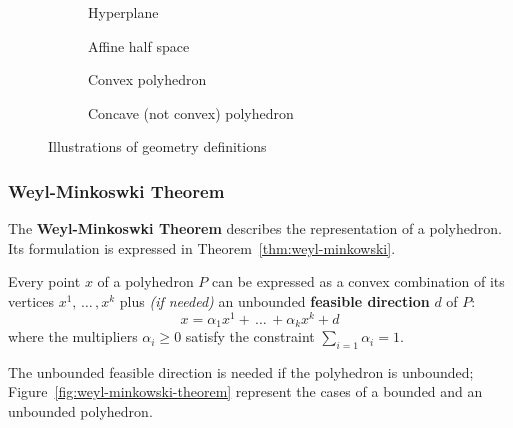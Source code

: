 \documentclass[english]{article}
\begin{document}
\begin{figure}[htbp]
  \bigskip
  \centering
  \begin{subfigure}[b]{0.495\textwidth}
    \centering
    \bigskip
    \caption{Hyperplane}
    \label{subfig:hyperplane}
    \bigskip
  \end{subfigure}
  \bigskip
  \begin{subfigure}[b]{0.495\textwidth}
    \centering
    \bigskip
    \caption{Affine half space}
    \label{subfig:affine-half-space}
    \bigskip
  \end{subfigure}
  \begin{subfigure}[h]{0.495\textwidth}
    \centering
    \bigskip
    \caption{Convex polyhedron}
    \label{subfig:convex-hull}
    \bigskip
  \end{subfigure}
  \begin{subfigure}[h]{0.495\textwidth}
    \centering
    \bigskip
    \caption{Concave (not convex) polyhedron}
    \label{subfig:not-convex-hull}
    \bigskip
  \end{subfigure}
  \caption{Illustrations of \LP geometry definitions}
  \label{fig:lp-geometry}
  \bigskip
\end{figure}

\subsubsection{Weyl-Minkoswki Theorem}

The \textbf{Weyl-Minkoswki Theorem} describes the representation of a polyhedron.
Its formulation is expressed in Theorem~\ref{thm:weyl-minkowski}.

\begin{theorem}
  Every point \(x\) of a polyhedron \(P\) can be expressed as a convex combination of its vertices \(x^1, \, \ldots \,, x^k\) plus \textit{(if needed)} an unbounded \textbf{feasible direction} \(d\) of \(P\):
  \[ x = \alpha_1 x^1 + \, \ldots \, + \alpha_k x^k + d \]
  where the multipliers \(\alpha_i \geq 0\) satisfy the constraint \(\displaystyle\sum_{i=1} \alpha_i = 1\).
  \label{thm:weyl-minkowski}
\end{theorem}

\bigskip
The unbounded feasible direction is needed if the polyhedron is unbounded; Figure~\ref{fig:weyl-minkowski-theorem} represent the cases of a bounded and an unbounded polyhedron.
\end{document}
